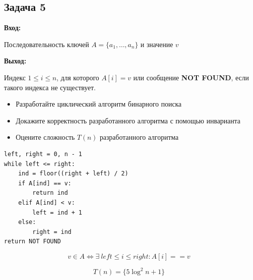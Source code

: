 \subsection{Задача 5}

\begin{exercise}

\textbf{Вход:}

Последовательность ключей $A = \{a_1, \ldots, a_n\}$ и значение $v$

\textbf{Выход:}

Индекс $1 \leq i \leq n$, для которого $A[i] = v$ или сообщение \textbf{NOT FOUND}, если такого индекса не существует. 

\begin{itemize}
    \item Разработайте циклический алгоритм бинарного поиска
    \item Докажите корректность разработанного алгоритма с помощью инварианта
    \item Оцените сложность $T(n)$ разработанного алгоритма
\end{itemize}
    
\end{exercise}

\begin{solution}
\begin{lstlisting}
left, right = 0, n - 1
while left <= right: 
    ind = floor((right + left) / 2)
    if A[ind] == v: 
        return ind
    elif A[ind] < v: 
        left = ind + 1
    else:
        right = ind 
return NOT FOUND  
\end{lstlisting}

\begin{theorem}[Утверждение]
    $$v \in A \Leftrightarrow \exists\ left \leq i \leq right : A[i] == v$$
\end{theorem}

\[
    T(n) = \{5 \log ^ 2 n + 1\}
\]
\end{solution}
